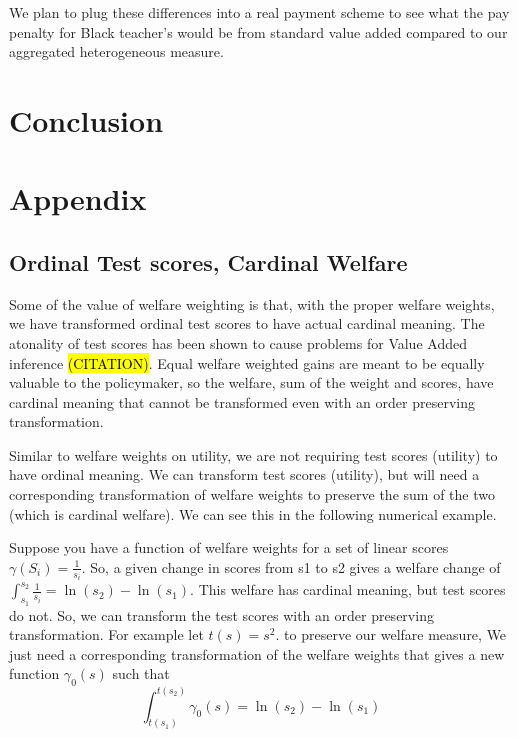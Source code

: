 \documentclass[12pt]{article}
\theoremstyle{definition}
\theoremstyle{definition}
\theoremstyle{definition}
\theoremstyle{definition}
\begin{document}
We plan to plug these differences into a real payment scheme to see what the pay penalty for Black teacher's would be from standard value added compared to our aggregated heterogeneous measure. 

\section{Conclusion} \label{conc} 




\section{Appendix}

   \subsection{Ordinal Test scores, Cardinal Welfare}
   \label{Cardinal_note}
    Some of the value of welfare weighting is that, with the proper welfare weights, we have transformed ordinal test scores to have actual cardinal meaning. The atonality of test scores has been shown to cause problems for Value Added inference \hl{(CITATION)}. Equal welfare weighted gains are meant to be equally valuable to the policymaker, so the welfare, sum of the weight and scores, have cardinal meaning that cannot be transformed even with an order preserving transformation. 
    
    Similar to welfare weights on utility, we are not requiring test scores (utility) to have ordinal meaning. We can transform test scores (utility), but will need a corresponding transformation of welfare weights to preserve the sum of the two (which is cardinal welfare). We can see this in the following numerical example. 
    
    Suppose you have a function of welfare weights for a set of linear scores $\gamma(S_i) = \frac{1}{s_i}$. So, a given change in scores from s1 to s2 gives a welfare change of $\int_{s_1}^{s_2} \frac{1}{s_i} = \ln(s_2)-\ln(s_1)$. This welfare has cardinal meaning, but test scores do not. So, we can transform the test scores with an order preserving transformation. For example let $t(s) = s^2$. to preserve our welfare measure, We just need a corresponding transformation of the welfare weights that gives a new function $\gamma_0(s)$ such that 
    $$\int_{t(s_1)}^{t(s_2)}\gamma_0(s)  = \ln(s_2)-\ln(s_1)$$
    
\end{document}
